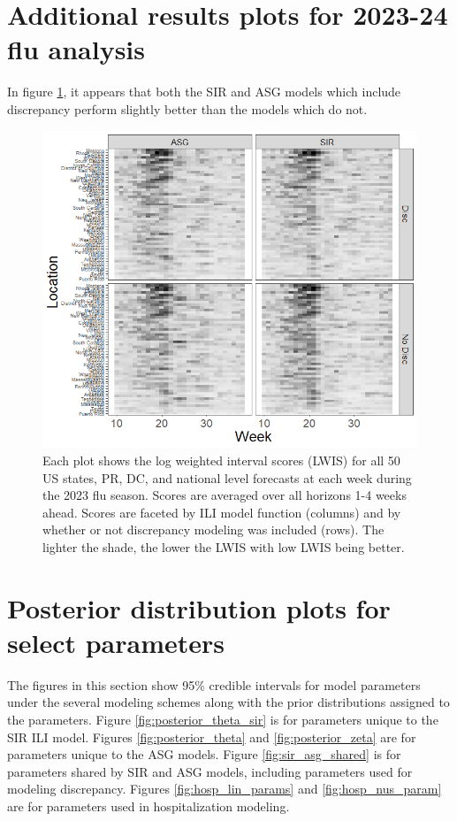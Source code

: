 \documentclass[ba]{imsart}
\theoremstyle{plain}
\theoremstyle{definition}
\theoremstyle{remark}
\begin{document}
\begin{supplement}
\section{Additional results plots for 2023-24 flu analysis}

In figure \ref{fig:lwis_by_traj_loc}, it appears that both the SIR and ASG models which include discrepancy perform slightly better than the models which do not.

\begin{figure}[hbt!]
    
    \centering
    \includegraphics[scale = .7]{Images/lwis_by_traj_loc.png}
    \caption{Each plot shows the log weighted interval scores (LWIS) for all 50 US states, PR, DC, and national level forecasts at each week during the 2023 flu season. Scores are averaged over all horizons 1-4 weeks ahead. Scores are faceted by ILI model function (columns) and by whether or not discrepancy modeling was included (rows). The lighter the shade, the lower the LWIS with low LWIS being better.}
    \label{fig:lwis_by_traj_loc}
\end{figure}



\section{Posterior distribution plots for select parameters}
\label{app:B_prior}

The figures in this section show 95\% credible intervals for model parameters under the several modeling schemes along with the prior distributions assigned to the parameters. Figure \ref{fig:posterior_theta_sir} is for parameters unique to the SIR ILI model. Figures \ref{fig:posterior_theta} and \ref{fig:posterior_zeta} are for parameters unique to the ASG models. Figure \ref{fig:sir_asg_shared} is for parameters shared by SIR and ASG models, including parameters used for modeling discrepancy. Figures \ref{fig:hosp_lin_params} and \ref{fig:hosp_nus_param} are for parameters used in hospitalization modeling.



\end{supplement}
\end{document}
